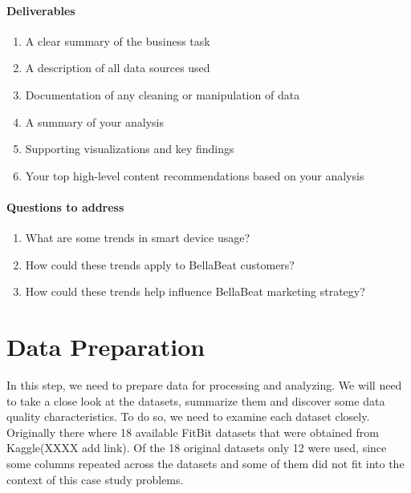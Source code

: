 \documentclass[
]{article}
\providecommand{\tightlist}{%
  \setlength{\itemsep}{0pt}\setlength{\parskip}{0pt}}
\begin{document}
\hypertarget{deliverables}{%
\paragraph{Deliverables}\label{deliverables}}

\begin{enumerate}
\def\labelenumi{\arabic{enumi}.}
\tightlist
\item
  A clear summary of the business task
\item
  A description of all data sources used
\item
  Documentation of any cleaning or manipulation of data
\item
  A summary of your analysis
\item
  Supporting visualizations and key findings
\item
  Your top high-level content recommendations based on your analysis
\end{enumerate}

\hypertarget{questions-to-address}{%
\paragraph{Questions to address}\label{questions-to-address}}

\begin{enumerate}
\def\labelenumi{\arabic{enumi}.}
\tightlist
\item
  What are some trends in smart device usage?
\item
  How could these trends apply to BellaBeat customers?
\item
  How could these trends help influence BellaBeat marketing strategy?
\end{enumerate}

\hypertarget{data-preparation}{%
\section{Data Preparation}\label{data-preparation}}

In this step, we need to prepare data for processing and analyzing. We
will need to take a close look at the datasets, summarize them and
discover some data quality characteristics. To do so, we need to examine
each dataset closely. Originally there where 18 available FitBit
datasets that were obtained from Kaggle(XXXX add link). Of the 18
original datasets only 12 were used, since some columns repeated across
the datasets and some of them did not fit into the context of this case
study problems.
\end{document}
